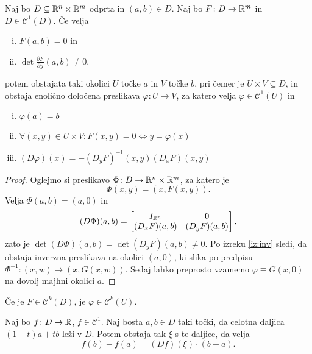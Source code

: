 \begin{izrek}
Naj bo $D \subseteq \mathbb{R}^n \times \mathbb{R}^m$ odprta in $(a,b) \in D$.
Naj bo $F \colon D\to \mathbb{R}^m$ in $D \in \mathcal{C}^1(D)$. Če velja

\begin{enumerate}[i)]
\item $F(a,b) = 0$ in
\item $\det \frac{\partial F}{\partial y}(a,b) \ne 0$,
\end{enumerate}

potem obstajata taki okolici $U$ točke $a$ in $V$ točke $b$, pri
čemer je $U \times V \subseteq D$, in obstaja enolično določena
preslikava $\varphi \colon U \to V$, za katero velja
$\varphi \in \mathcal{C}^1(U)$ in
\begin{enumerate}[i)]
\item $\varphi(a) = b$
\item $\forall (x,y) \in U \times V \colon F(x,y) = 0 \iff
y = \varphi(x)$
\item $(D\varphi)(x) = -(D_yF)^{-1}(x,y) (D_xF)(x,y)$
\end{enumerate}
\end{izrek}

\begin{proof}
Oglejmo si preslikavo $\Phi \colon D \to \mathbb{R}^n \times \mathbb{R}^m$, za
katero je
\[
\Phi(x,y) = (x, F(x,y)).
\]
Velja $\Phi(a,b) = (a,0)$ in
\[
(D\Phi)(a,b) =
\begin{bmatrix}
I_{\mathbb{R}^n}    & 0           \\ 
(D_xF)(a,b) & (D_yF)(a,b)
\end{bmatrix},
\]
zato je $\det(D\Phi)(a,b) = \det (D_yF)(a,b) \ne 0$. Po izreku
\ref{iz:inv} sledi, da obstaja inverzna preslikava na okolici
$(a,0)$, ki slika po predpisu
$\Phi^{-1} \colon (x,w) \mapsto (x, G(x,w))$. Sedaj lahko
preprosto vzamemo $\varphi \equiv G(x,0)$ na dovolj majhni
okolici $a$.
\end{proof}

\begin{opomba}
Če je $F \in \mathcal{C}^k(D)$, je $\varphi \in \mathcal{C}^k(U)$.
\end{opomba}


\begin{lema}
Naj bo $f \colon D \to \mathbb{R}$, $f \in \mathcal{C}^1$. Naj bosta
$a,b \in D$ taki točki, da celotna daljica $(1-t)a + tb$ leži v
$D$.
Potem obstaja tak $\xi$ s te daljice, da velja
\[
f(b) - f(a) = (Df)(\xi) \cdot (b-a).
\]
\end{lema}

